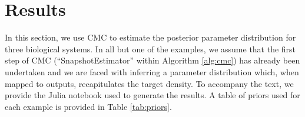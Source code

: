 \section{Results}\label{sec:results}
In this section, we use CMC to estimate the posterior parameter distribution for three biological systems.
In all but one of the examples, we assume that the first step of CMC (``SnapshotEstimator'' within Algorithm \ref{alg:cmc}) has already been undertaken and we are faced with inferring a parameter distribution which, when mapped to outputs, recapitulates the target density. To accompany the text, we provide the Julia notebook used to generate the results. %
A table of priors used for each example is provided in Table \ref{tab:priors}.


